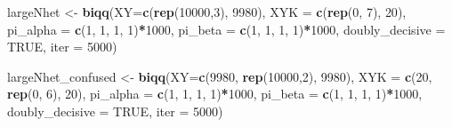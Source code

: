 \documentclass[12pt,]{book}
\newenvironment{Shaded}{\begin{snugshade}}{\end{snugshade}}
\newcommand{\DataTypeTok}[1]{\textcolor[rgb]{0.13,0.29,0.53}{#1}}
\newcommand{\DecValTok}[1]{\textcolor[rgb]{0.00,0.00,0.81}{#1}}
\newcommand{\KeywordTok}[1]{\textcolor[rgb]{0.13,0.29,0.53}{\textbf{#1}}}
\newcommand{\NormalTok}[1]{#1}
\newcommand{\OperatorTok}[1]{\textcolor[rgb]{0.81,0.36,0.00}{\textbf{#1}}}
\newcommand{\OtherTok}[1]{\textcolor[rgb]{0.56,0.35,0.01}{#1}}
\newcommand{\StringTok}[1]{\textcolor[rgb]{0.31,0.60,0.02}{#1}}
\begin{document}
\begin{Shaded}
\begin{Highlighting}[]
\NormalTok{largeNhet <-}\StringTok{ }\KeywordTok{biqq}\NormalTok{(}\DataTypeTok{XY=}\KeywordTok{c}\NormalTok{(}\KeywordTok{rep}\NormalTok{(}\DecValTok{10000}\NormalTok{,}\DecValTok{3}\NormalTok{), }\DecValTok{9980}\NormalTok{), }\DataTypeTok{XYK =} \KeywordTok{c}\NormalTok{(}\KeywordTok{rep}\NormalTok{(}\DecValTok{0}\NormalTok{, }\DecValTok{7}\NormalTok{), }\DecValTok{20}\NormalTok{), }
     \DataTypeTok{pi_alpha =} \KeywordTok{c}\NormalTok{(}\DecValTok{1}\NormalTok{, }\DecValTok{1}\NormalTok{, }\DecValTok{1}\NormalTok{, }\DecValTok{1}\NormalTok{)}\OperatorTok{*}\DecValTok{1000}\NormalTok{,}
     \DataTypeTok{pi_beta =} \KeywordTok{c}\NormalTok{(}\DecValTok{1}\NormalTok{, }\DecValTok{1}\NormalTok{, }\DecValTok{1}\NormalTok{, }\DecValTok{1}\NormalTok{)}\OperatorTok{*}\DecValTok{1000}\NormalTok{,}
     \DataTypeTok{doubly_decisive =} \OtherTok{TRUE}\NormalTok{, }\DataTypeTok{iter =} \DecValTok{5000}\NormalTok{)}


\NormalTok{largeNhet_confused <-}\StringTok{ }\KeywordTok{biqq}\NormalTok{(}\DataTypeTok{XY=}\KeywordTok{c}\NormalTok{(}\DecValTok{9980}\NormalTok{, }\KeywordTok{rep}\NormalTok{(}\DecValTok{10000}\NormalTok{,}\DecValTok{2}\NormalTok{), }\DecValTok{9980}\NormalTok{), }\DataTypeTok{XYK =} \KeywordTok{c}\NormalTok{(}\DecValTok{20}\NormalTok{, }\KeywordTok{rep}\NormalTok{(}\DecValTok{0}\NormalTok{, }\DecValTok{6}\NormalTok{), }\DecValTok{20}\NormalTok{), }
     \DataTypeTok{pi_alpha =} \KeywordTok{c}\NormalTok{(}\DecValTok{1}\NormalTok{, }\DecValTok{1}\NormalTok{, }\DecValTok{1}\NormalTok{, }\DecValTok{1}\NormalTok{)}\OperatorTok{*}\DecValTok{1000}\NormalTok{,}
     \DataTypeTok{pi_beta =} \KeywordTok{c}\NormalTok{(}\DecValTok{1}\NormalTok{, }\DecValTok{1}\NormalTok{, }\DecValTok{1}\NormalTok{, }\DecValTok{1}\NormalTok{)}\OperatorTok{*}\DecValTok{1000}\NormalTok{,}
     \DataTypeTok{doubly_decisive =} \OtherTok{TRUE}\NormalTok{, }\DataTypeTok{iter =} \DecValTok{5000}\NormalTok{)}
\end{Highlighting}
\end{Shaded}
\end{document}
